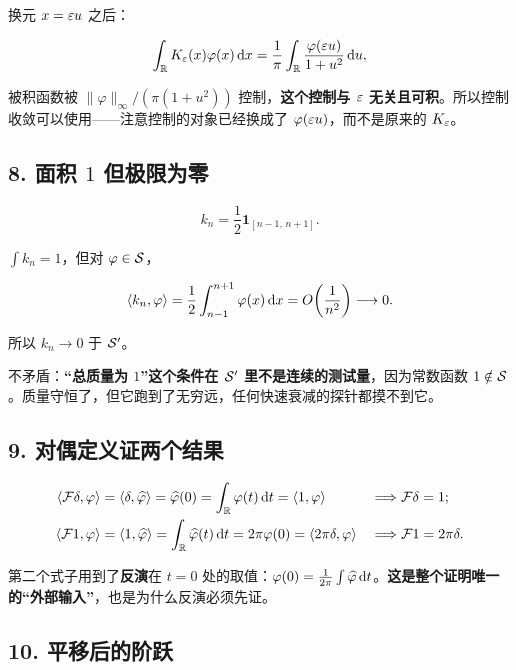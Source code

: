 换元 $x=\varepsilon u$ 之后：

\begin{equation}
\int_{\mathbb{R}}K_\varepsilon(x)\varphi(x)\mathop{}\!\mathrm{d} x=\frac{1}{\pi}\int_{\mathbb{R}}\frac{\varphi(\varepsilon u)}{1+u^{2}}\mathop{}\!\mathrm{d} u,
\end{equation}

被积函数被 $\|\varphi\|_\infty/(\pi(1+u^{2}))$ 控制，\textbf{这个控制与 $\varepsilon$ 无关且可积}。所以控制收敛可以使用——注意控制的对象已经换成了 $\varphi(\varepsilon u)$，而不是原来的 $K_\varepsilon$。

\subsection*{8. 面积 $1$ 但极限为零}

\begin{equation}
k_n=\frac{1}{2}\mathbf{1}_{[n-1,\,n+1]}.
\end{equation}

$\int k_n=1$，但对 $\varphi\in\mathcal{S}$，

\begin{equation}
\langle k_n,\varphi\rangle=\frac{1}{2}\int_{n-1}^{n+1}\varphi(x)\mathop{}\!\mathrm{d} x=O\!\left(\frac{1}{n^{2}}\right)\longrightarrow0 .
\end{equation}

所以 $k_n\to0$ 于 $\mathcal{S}'$。

不矛盾：\textbf{“总质量为 $1$”这个条件在 $\mathcal{S}'$ 里不是连续的测试量}，因为常数函数 $1\notin\mathcal{S}$。质量守恒了，但它跑到了无穷远，任何快速衰减的探针都摸不到它。

\subsection*{9. 对偶定义证两个结果}

\begin{align}
\langle \mathcal{F}\delta,\varphi\rangle&=\langle \delta,\widehat{\varphi}\rangle=\widehat{\varphi}(0)=\int_{\mathbb{R}}\varphi(t)\mathop{}\!\mathrm{d} t=\langle 1,\varphi\rangle
&&\Longrightarrow \mathcal{F}\delta=1;\\
\langle \mathcal{F}1,\varphi\rangle&=\langle 1,\widehat{\varphi}\rangle=\int_{\mathbb{R}}\widehat{\varphi}(t)\mathop{}\!\mathrm{d} t=2\pi\varphi(0)=\langle 2\pi\delta,\varphi\rangle
&&\Longrightarrow \mathcal{F}1=2\pi\delta .
\end{align}

第二个式子用到了\textbf{反演}在 $t=0$ 处的取值：$\varphi(0)=\frac{1}{2\pi}\int\widehat{\varphi}\mathop{}\!\mathrm{d} t$。\textbf{这是整个证明唯一的“外部输入”}，也是为什么反演必须先证。

\subsection*{10. 平移后的阶跃}

